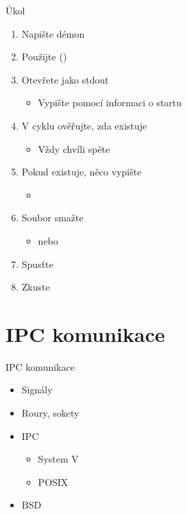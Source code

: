 \begin{frame}{Úkol}

  \begin{enumerate}
    \item Napište démon
    \item Použijte  ()
    \item Otevřete  jako stdout
    \begin{itemize}
      \item Vypište pomocí  informaci o startu
    \end{itemize}

    \item V cyklu ověřujte, zda existuje 
    \begin{itemize}
      \item Vždy chvíli spěte
    \end{itemize}

    \item Pokud existuje, něco vypište
    \begin{itemize}
      \item {}
    \end{itemize}

    \item Soubor smažte
    \begin{itemize}
      \item {} nebo 
    \end{itemize}

    \item Spusťte
    \item Zkuste 
  \end{enumerate}

\end{frame}

\section{IPC komunikace}
\frame{\sectionpage}

\begin{frame}{IPC komunikace}

  \begin{itemize}
    \item Signály
    \item Roury, sokety
    \item IPC
    \begin{itemize}
      \item System V
      \item POSIX
    \end{itemize}

    \item BSD 
  \end{itemize}

\end{frame}

